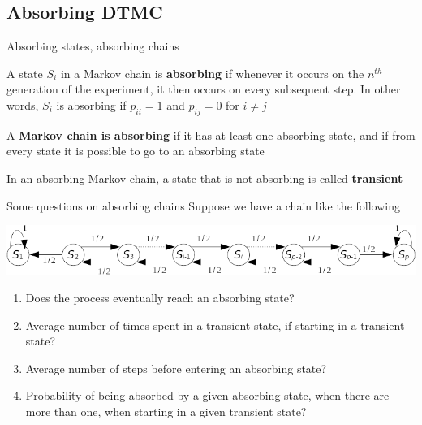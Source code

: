 \documentclass[aspectratio=169]{beamer}
\begin{document}
\subsection{Absorbing DTMC}

\begin{frame}{Absorbing states, absorbing chains}
    \begin{definition}
        A state $S_i$ in a Markov chain is \textbf{absorbing} if whenever it occurs on the $n^{th}$ generation of the experiment, it then occurs on every subsequent step. In other words, $S_i$ is absorbing if $p_{ii}=1$ and $p_{ij}=0$ for $i\neq j$
    \end{definition}
    \begin{definition}
        A \textbf{Markov chain is absorbing} if it has at least one absorbing state, and if from every state it is possible to go to an absorbing state
    \end{definition}
    \begin{definition}
        In an absorbing Markov chain, a state that is not absorbing is called \textbf{transient}
    \end{definition}
\end{frame}

\begin{frame}{Some questions on absorbing chains}
    Suppose we have a chain like the following
    \begin{center}
        \includegraphics[width=\textwidth]{FIGS/drunk_mans_walk_absorbing}
    \end{center}
    \begin{enumerate}
        \item Does the process eventually reach an absorbing state?
        \item Average number of times spent in a transient state, if starting in a transient state?
        \item Average number of steps before entering an absorbing state?
        \item Probability of being absorbed by a given absorbing state, when there are more than one, when starting in a given transient state?
    \end{enumerate}
\end{frame}
\end{document}

